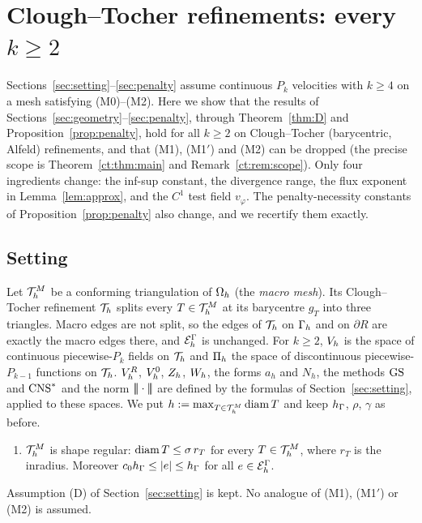 \section{Clough--Tocher refinements: every \texorpdfstring{$k\ge2$}{k>=2}}\label{ct:sec}

Sections~\ref{sec:setting}--\ref{sec:penalty} assume continuous $P_k$ velocities with $k\ge4$ on a mesh satisfying (M0)--(M2). Here we show that the results of Sections~\ref{sec:geometry}--\ref{sec:penalty}, through Theorem~\ref{thm:D} and Proposition~\ref{prop:penalty}, hold for all $k\ge2$ on Clough--Tocher (barycentric, Alfeld) refinements, and that (M1), (M1$'$) and (M2) can be dropped (the precise scope is Theorem~\ref{ct:thm:main} and Remark~\ref{ct:rem:scope}). Only four ingredients change: the inf-sup constant, the divergence range, the flux exponent in Lemma~\ref{lem:approx}, and the $C^1$ test field $v_\varphi$. The penalty-necessity constants of Proposition~\ref{prop:penalty} also change, and we recertify them exactly.

\subsection{Setting}
Let $\mathcal T_h^M$ be a conforming triangulation of $\Omega_h$ (the \emph{macro mesh}). Its Clough--Tocher refinement $\mathcal T_h$ splits every $T\in\mathcal T_h^M$ at its barycentre $g_T$ into three triangles. Macro edges are not split, so the edges of $\mathcal T_h$ on $\Gamma_h$ and on $\partial R$ are exactly the macro edges there, and $\mathcal E_h^\Gamma$ is unchanged.
For $k\ge2$, $V_h$ is the space of continuous piecewise-$P_k$ fields on $\mathcal T_h$ and $\Pi_h$ the space of discontinuous piecewise-$P_{k-1}$ functions on $\mathcal T_h$. $V_h^R$, $V_h^0$, $Z_h$, $W_h$, the forms $a_h$ and $N_h$, the methods $\mathrm{GS}$ and $\mathrm{CNS}^\ast$ and the norm $|\!|\!|\cdot|\!|\!|$ are defined by the formulas of Section~\ref{sec:setting}, applied to these spaces.
We put $h:=\max_{T\in\mathcal T_h^M}\operatorname{diam} T$ and keep $h_\Gamma$, $\rho$, $\gamma$ as before.

\begin{assumption}\label{ct:ass}\leavevmode
\begin{enumerate}[label=(CT\arabic*),start=0]
\item $\mathcal T_h^M$ is shape regular: $\operatorname{diam} T\le\sigma\,r_T$ for every $T\in\mathcal T_h^M$, where $r_T$ is the inradius. Moreover $c_0h_\Gamma\le|e|\le h_\Gamma$ for all $e\in\mathcal E_h^\Gamma$.
\end{enumerate}
Assumption (D) of Section~\ref{sec:setting} is kept. No analogue of (M1), (M1$'$) or (M2) is assumed.
\end{assumption}


